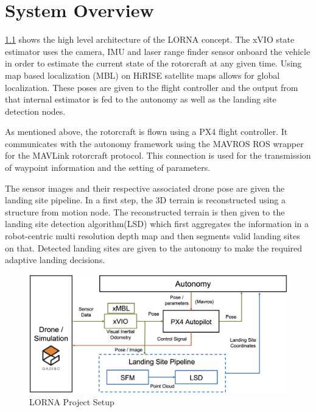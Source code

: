 \chapter{System Overview}

\cref{fig:lorna_setup} shows the high level architecture of the LORNA concept. 
The xVIO state estimator uses the camera, IMU and laser range finder sensor onboard the vehicle in order to estimate the current state of the rotorcraft at any given time. Using map based localization (MBL) on HiRISE satellite maps allows for global localization. These poses are given to the flight controller and the output from that internal estimator is fed to the autonomy as well as the landing site detection nodes.

As mentioned above, the rotorcraft is flown using a PX4 flight controller. It communicates with the autonomy framework using the MAVROS ROS wrapper for the MAVLink rotorcraft protocol. This connection is used for the transmission of waypoint information and the setting of parameters.

The sensor images and their respective associated drone pose are given the landing site pipeline. In a first step, the 3D terrain is reconstructed using a structure from motion node. The reconstructed terrain is then given to the landing site detection algorithm(LSD) which first aggregates the information in a robot-centric multi resolution depth map and then segments valid landing sites on that. Detected landing sites are given to the autonomy to make the required adaptive landing decisions.



\begin{figure}[ht]
    \centering
    \includegraphics[scale=0.18]{images/system_overview/setup_flowchart_with_vio.png}
    \caption{LORNA Project Setup}
    \label{fig:lorna_setup}
\end{figure}

